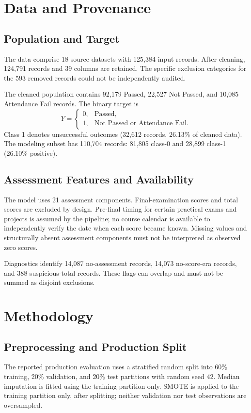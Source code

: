 \documentclass[conference]{IEEEtran}
\begin{document}
\section{Data and Provenance}
\subsection{Population and Target}
The data comprise 18 source datasets with 125,384 input records. After cleaning, 124,791 records and 39 columns are retained. The specific exclusion categories for the 593 removed records could not be independently audited.

The cleaned population contains 92,179 Passed, 22,527 Not Passed, and 10,085 Attendance Fail records. The binary target is
\[
Y=\begin{cases}0,&\text{Passed},\\1,&\text{Not Passed or Attendance Fail}.\end{cases}
\]
Class 1 denotes unsuccessful outcomes (32,612 records, 26.13\% of cleaned data). The modeling subset has 110,704 records: 81,805 class-0 and 28,899 class-1 (26.10\% positive).

\subsection{Assessment Features and Availability}
The model uses 21 assessment components. Final-examination scores and total scores are excluded by design. Pre-final timing for certain practical exams and projects is assumed by the pipeline; no course calendar is available to independently verify the date when each score became known. Missing values and structurally absent assessment components must not be interpreted as observed zero scores.

Diagnostics identify 14,087 no-assessment records, 14,073 no-score-era records, and 388 suspicious-total records. These flags can overlap and must not be summed as disjoint exclusions.

\section{Methodology}
\subsection{Preprocessing and Production Split}
The reported production evaluation uses a stratified random split into 60\% training, 20\% validation, and 20\% test partitions with random seed 42. Median imputation is fitted using the training partition only. SMOTE is applied to the training partition only, after splitting; neither validation nor test observations are oversampled.
\end{document}
